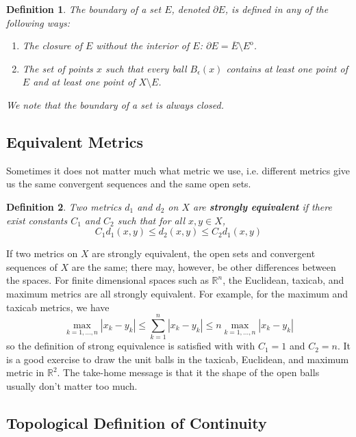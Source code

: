 \documentclass[12pt]{amsart}         %
\newtheorem{definition}{Definition}[section]
\theoremstyle{remark}
\newcommand{\R}{\mathbb{R}}
\begin{document}
\begin{definition}
The \emph{boundary} of a set $E$, denoted $\partial E$, is defined in any of the following ways:
\begin{enumerate}
\item The closure of $E$ without the interior of $E$: $\partial E = \overline{E}\setminus E^\mathrm{o}$.
\item The set of points $x$ such that every ball $B_{\epsilon}(x)$ contains at least one point of $E$ and at least one point of $X\setminus E$.
\end{enumerate}

We note that the boundary of a set is always closed.

\end{definition}

\subsection{Equivalent Metrics}

Sometimes it does not matter much what metric we use, i.e. different metrics give us the same convergent sequences and the same open sets. 

\begin{definition}
Two metrics $d_1$ and $d_2$ on $X$ are \textbf{strongly equivalent} if there exist constants $C_1$ and $C_2$ such that for all $x, y \in X$,
\[
C_1 d_1(x,y) \leq d_2(x,y) \leq C_2 d_1(x,y)
\]
\end{definition}

If two metrics on $X$ are strongly equivalent, the open sets and convergent sequences of $X$ are the same; there may, however, be other differences between the spaces. For finite dimensional spaces such as $\R^n$, the Euclidean, taxicab, and maximum metrics are all strongly equivalent. For example, for the maximum and taxicab metrics, we have
\[
\max_{k=1, \dots, n}|x_k - y_k| \leq \sum_{k=1}^n |x_k - y_k| \leq n \max_{k=1, \dots, n}|x_k - y_k|
\]
so the definition of strong equivalence is satisfied with with $C_1 = 1$ and $C_2 = n$. It is a good exercise to draw the unit balls in the taxicab, Euclidean, and maximum metric in $\R^2$. The take-home message is that it the shape of the open balls usually don't matter too much.

\subsection{Topological Definition of Continuity}
\end{document}
